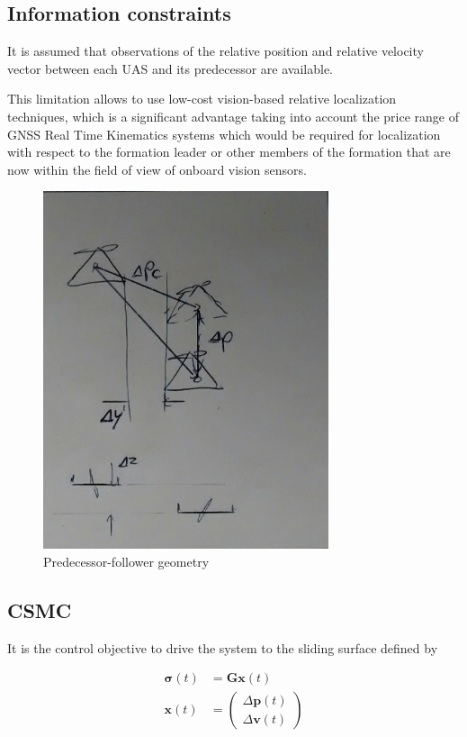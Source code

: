 \documentclass{ifacconf}
\providecommand{\mbf}[1]{\mathbf{#1}}
\begin{document}
\subsection{Information constraints}
It is assumed that observations of the relative position and relative velocity vector between each UAS and its predecessor are available. 

This limitation allows to use low-cost vision-based relative localization techniques, which is a significant advantage taking into account the price range of GNSS Real Time Kinematics systems which would be required for localization with respect to the formation leader or other members of the formation that are now within the field of view of onboard vision sensors.

\begin{figure}
\begin{center}
\includegraphics[width=8.4cm]{geometry}    %
\caption{Predecessor-follower geometry} 
\label{fig:geometry}
\end{center}
\end{figure}

\subsection{CSMC}

It is the control objective to drive the system to the sliding surface defined by 

\begin{align}
\mbf{\sigma}(t) &= \mbf{G}\mbf{x}(t)
\label{eq:defsigmaconti-} \\
\mbf{x}(t) &= 
\begin{pmatrix}
\Delta \mbf{p}(t)\\
\Delta \mbf{v}(t)
\end{pmatrix}
\end{align}
\end{document}

